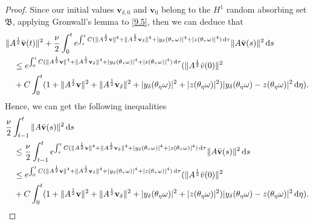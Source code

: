 \documentclass{elsarticle}
\theoremstyle{definition}
\numberwithin{equation}{section}
\renewcommand{\d}{{\rm{d}}}
\begin{document}
\begin{proof}
Since our initial values $\textbf{v}_{\delta,0}$ and $\textbf{v}_{0}$   belong to the $H^1$ random  absorbing set  $\mathfrak B$,  applying Gronwall's lemma to \eqref{9.5}, then we can deduce    that
\begin{align}
 & \|A^\frac12\bar{\textbf{v}}(t)\|^2 + \frac{\nu}{2} \int_0^te^{\int_s^tC( \|A^\frac12\textbf{v}\|^4+\|A^\frac12\textbf{v}_\delta\|^4+|y_\delta(\theta_\tau\omega)|^4+|z(\theta_\tau\omega)|^4)\, \d \tau}\|A\bar{\textbf{v}}(s) \|^2\, \d s
\nonumber\\
&\quad \leq e^{\int_0^tC( \|A^\frac12\textbf{v}\|^4+\|A^\frac12\textbf{v}_\delta\|^4+|y_\delta(\theta_\tau\omega)|^4+|z(\theta_\tau\omega)|^4)\, \d \tau} (\|A^\frac12\bar{v}(0)\|^2\nonumber\\
&\quad +C\int_0^t(1+\|A^\frac12\textbf{v}\|^2+\|A^\frac12\textbf{v}_\delta\|^2 +|y_\delta(\theta_\eta\omega)|^2+|z(\theta_\eta\omega)|^2)
|y_\delta(\theta_\eta\omega)-z(\theta_\eta\omega)|^2 \, \d \eta)
.
\end{align}
Hence, we can get the  following inequalities
\begin{align*}
& \frac{\nu}{2} \int_{t-1}^t\|A\bar{\textbf{v}}(s)\|^2\, \d s\nonumber\\
& \quad \leq\frac{\nu}{2} \int_{t-1}^te^{\int_s^tC( \|A^\frac12\textbf{v}\|^4+\|A^\frac12\textbf{v}_\delta\|^4+|y_\delta(\theta_\tau\omega)|^4+|z(\theta_\tau\omega)|^4)\, \d \tau}\|A\bar{\textbf{v}}(s)\|^2\, \d s\nonumber\\
&\quad \leq e^{\int_0^tC( \|A^\frac12\textbf{v}\|^4+\|A^\frac12\textbf{v}_\delta\|^4+|y_\delta(\theta_\tau\omega)|^4+|z(\theta_\tau\omega)|^4)\, \d \tau} (\|A^\frac12\bar{v}(0)\|^2\nonumber\\
&\quad +C\int_0^t(1+\|A^\frac12\textbf{v}\|^2+\|A^\frac12\textbf{v}_\delta\|^2 +|y_\delta(\theta_\eta\omega)|^2+|z(\theta_\eta\omega)|^2)
|y_\delta(\theta_\eta\omega)-z(\theta_\eta\omega)|^2 \, \d \eta)
.
\end{align*}


\end{proof}
\end{document}
